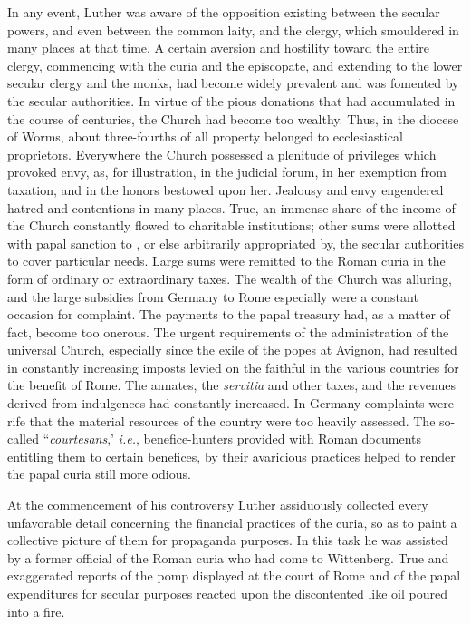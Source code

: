 In any event, Luther was aware of the opposition existing between the
secular powers, and even between the common laity, and the clergy, which
smouldered in many places at that time. A certain
aversion and hostility toward the entire clergy, commencing with
the curia and the episcopate, and extending to the lower secular
clergy and the monks, had become widely prevalent and was fomented by
the secular authorities. In virtue of the pious donations
that had accumulated in the course of centuries, the Church had
become too wealthy. Thus, in the diocese of Worms, about three-fourths
of all property belonged to ecclesiastical proprietors. Everywhere the
Church possessed a plenitude of privileges which provoked
envy, as, for illustration, in the judicial forum, in her exemption
from taxation, and in the honors bestowed upon her. Jealousy and
envy engendered hatred and contentions in many places. True, an
immense share of the income of the Church constantly flowed to
charitable institutions; other sums were allotted with papal sanction to
, or else arbitrarily appropriated by, the secular authorities to
cover particular needs. Large sums were remitted to the Roman
curia in the form of ordinary or extraordinary taxes. The wealth of
the Church was alluring, and the large subsidies from Germany to
Rome especially were a constant occasion for complaint. The payments to
the papal treasury had, as a matter of fact, become too
onerous. The urgent requirements of the administration of the universal
Church, especially since the exile of the popes at Avignon,
had resulted in constantly increasing imposts levied on the faithful in
the various countries for the benefit of Rome. The annates,
the \textit{servitia} and other taxes, and the revenues derived from indulgences
had constantly increased. In Germany complaints were rife that
the material resources of the country were too heavily assessed. The
so-called “\textit{courtesans},’ \textit{i.e.}, benefice-hunters provided with Roman
documents entitling them to certain benefices, by their avaricious
practices helped to render the papal curia still more odious.

At the commencement of his controversy Luther assiduously collected
every unfavorable detail concerning the financial practices
of the curia, so as to paint a collective picture of them for propaganda
purposes. In this task he was assisted by a former official of the
Roman curia who had come to Wittenberg. True and exaggerated
reports of the pomp displayed at the court of Rome and of the papal
expenditures for secular purposes reacted upon the discontented
like oil poured into a fire.

